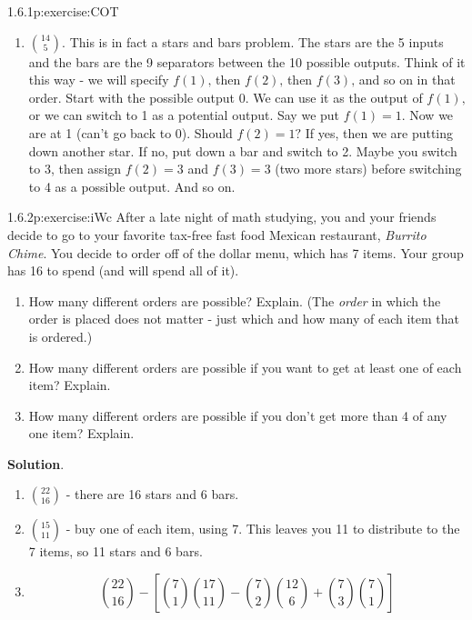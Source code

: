 \documentclass[twoside,11pt,]{book}
\newcommand{\blocktitlefont}{\relax}
\numberwithin{equation}{chapter}
\renewcommand{\d}{\displaystyle}
\begin{document}
\begin{divisionsolution}{1.6.1}{}{p:exercise:COT}
\begin{enumerate}[label=(\alph*)]
\item{}\({14 \choose 5}\text{.}\) This is in fact a stars and bars problem. The stars are the 5 inputs and the bars are the 9 separators between the 10 possible outputs. Think of it this way - we will specify \(f(1)\text{,}\) then \(f(2)\text{,}\) then \(f(3)\text{,}\) and so on in that order. Start with the possible output 0. We can use it as the output of \(f(1)\text{,}\) or we can switch to 1 as a potential output. Say we put \(f(1) = 1\text{.}\) Now we are at 1 (can't go back to 0). Should \(f(2) = 1\text{?}\) If yes, then we are putting down another star. If no, put down a bar and switch to 2. Maybe you switch to 3, then assign \(f(2) = 3\) and \(f(3) = 3\) (two more stars) before switching to 4 as a possible output. And so on.%
\end{enumerate}
%
\end{divisionsolution}%
\begin{divisionsolution}{1.6.2}{}{p:exercise:iWc}%
After a late night of math studying, you and your friends decide to go to your favorite tax-free fast food Mexican restaurant, \emph{Burrito Chime}. You decide to order off of the dollar menu, which has 7 items. Your group has \textdollar{}16 to spend (and will spend all of it).%
\begin{enumerate}[label=(\alph*)]
\item{}How many different orders are possible? Explain. (The \emph{order} in which the order is placed does not matter - just which and how many of each item that is ordered.)%
\item{}How many different orders are possible if you want to get at least one of each item? Explain.%
\item{}How many different orders are possible if you don't get more than 4 of any one item? Explain.%
\end{enumerate}
%
\par\smallskip%
\noindent\textbf{\blocktitlefont Solution}.\quad{}%
\begin{enumerate}[label=(\alph*)]
\item{}\(\d{22 \choose 16}\) - there are 16 stars and 6 bars.%
\item{}\(\d{15 \choose 11}\) - buy one of each item, using \textdollar{}7. This leaves you \textdollar{}11 to distribute to the 7 items, so 11 stars and 6 bars.%
\item{}%
\begin{equation*}
{22 \choose 16} - \left[{7 \choose 1}{17 \choose 11} - {7 \choose 2}{12 \choose 6} + {7 \choose 3}{7 \choose 1} \right]
\end{equation*}
%
\end{enumerate}
%
\end{divisionsolution}%
\end{document}
